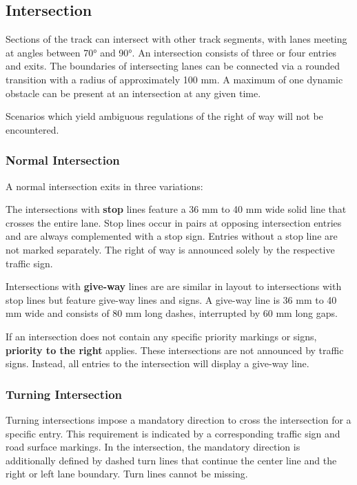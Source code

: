 \subsection{Intersection}
\label{intersection}

Sections of the track can intersect with other track segments, with lanes meeting at angles between 70° and 90°. 
An intersection consists of three or four entries and exits.
The boundaries of intersecting lanes can be connected via a rounded transition with a radius of approximately 100 mm.
A maximum of one dynamic obstacle can be present at an intersection at any given time.

Scenarios which yield ambiguous regulations of the right of way will not be encountered.

\subsubsection{Normal Intersection}

A normal intersection exits in three variations:

The intersections with \textbf{stop} lines feature a 36 mm to 40 mm wide solid line that crosses the entire lane.
Stop lines occur in pairs at opposing intersection entries and are always complemented with a stop sign. 
Entries without a stop line are not marked separately. 
The right of way is announced solely by the respective traffic sign.

Intersections with \textbf{give-way} lines are are similar in layout to intersections with stop lines but feature give-way lines and signs. 
A give-way line is 36 mm to 40 mm wide and consists of 80 mm long dashes, interrupted by 60 mm long gaps.

If an intersection does not contain any specific priority markings or signs, \textbf{priority to the right} applies.
These intersections are not announced by traffic signs. Instead, all entries to the intersection will display a give-way line.

\subsubsection{Turning Intersection}

Turning intersections impose a mandatory direction to cross the intersection for a specific entry.
This requirement is indicated by a corresponding traffic sign and road surface markings.
In the intersection, the mandatory direction is additionally defined by dashed turn lines that continue the center line and the right or left lane boundary.
Turn lines cannot be missing.

